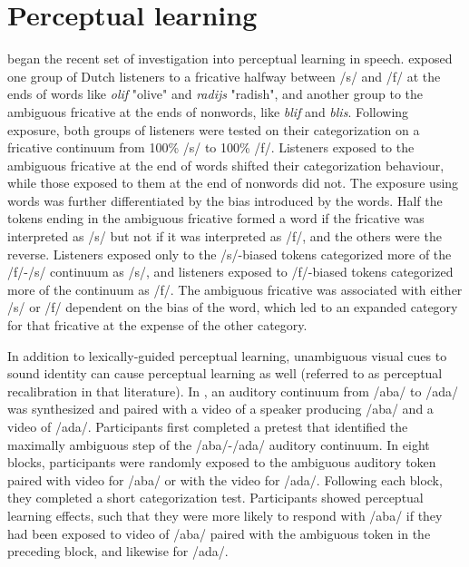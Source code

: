 \section{Perceptual learning}
\label{sec:perceptuallearning}


\citet{Norris2003} began the recent set of investigation into perceptual learning in speech.
\citet{Norris2003} exposed one group of Dutch listeners to a fricative halfway between /s/ and /f/ at the ends of words like \emph{olif} "olive" and \emph{radijs} "radish", and another group to the ambiguous fricative at the ends of nonwords, like \emph{blif} and \emph{blis}.
Following exposure, both groups of listeners were tested on their categorization on a fricative continuum from 100\% /s/ to 100\% /f/. 
Listeners exposed to the ambiguous fricative at the end of words shifted their categorization behaviour, while those exposed to them at the end of nonwords did not.  The exposure using words was further differentiated by the bias introduced by the words.  
Half the tokens ending in the ambiguous fricative formed a word if the fricative was interpreted as /s/ but not if it was interpreted as /f/, and the others were the reverse.  
Listeners exposed only to the /s/-biased tokens categorized more of the /f/-/s/ continuum as /s/, and listeners exposed to /f/-biased tokens categorized more of the continuum as /f/.  
The ambiguous fricative was associated with either /s/ or /f/ dependent on the bias of the word, which led to an expanded category for that fricative at the expense of the other category.

In addition to lexically-guided perceptual learning, unambiguous visual cues to sound identity can cause perceptual learning as well (referred to as perceptual recalibration in that literature).
In \citet{Bertelson2003}, an auditory continuum from /aba/ to /ada/ was synthesized and paired with a video of a speaker producing /aba/ and a video of /ada/.  
Participants first completed a pretest that identified the maximally ambiguous step of the /aba/-/ada/ auditory continuum. 
 In eight blocks, participants were randomly exposed to the ambiguous auditory token paired with video for /aba/ or with the video for /ada/.  Following each block, they completed a short categorization test.  
Participants showed perceptual learning effects, such that they were more likely to respond with /aba/ if they had been exposed to video of /aba/ paired with the ambiguous token in the preceding block, and likewise for /ada/.

